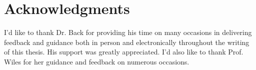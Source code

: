 

\chapter{Acknowledgments}

I'd like to thank Dr. Back for providing his time on many occasions in delivering feedback and guidance both in person and electronically throughout the writing of this thesis. His support was greatly appreciated. I'd also like to thank Prof. Wiles for her guidance and feedback on numerous occasions.

\cleardoublepage